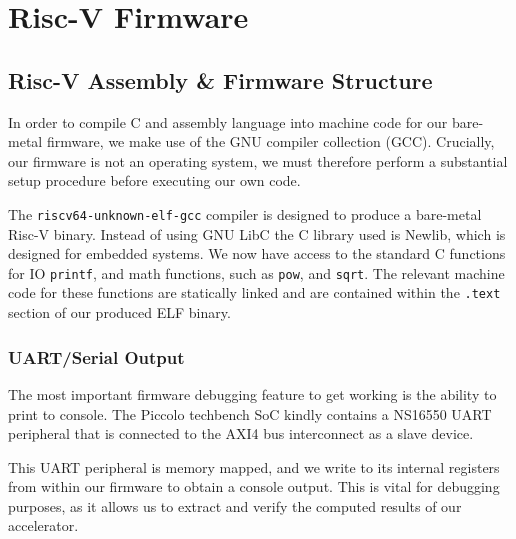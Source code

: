 \documentclass[a4paper,8pt]{report}
\begin{document}

\section{Risc-V Firmware}
\subsection{Risc-V Assembly \& Firmware Structure}
In order to compile C and assembly language into machine code for our bare-metal
firmware, we make use of the GNU compiler collection (GCC). Crucially, our
firmware is not an operating system, we must therefore perform a substantial
setup procedure before executing our own code.


The \texttt{riscv64-unknown-elf-gcc} compiler is designed to produce a
bare-metal Risc-V binary. Instead of using GNU LibC the C library used is
Newlib, which is designed for embedded systems. We now have access to the
standard C functions for IO \texttt{printf}, and math functions, such as
\texttt{pow}, and \texttt{sqrt}. The relevant machine code for these functions
are statically linked and are contained within the \texttt{.text} section of our
produced ELF binary.

\subsubsection{UART/Serial Output}
The most important firmware debugging feature to get working is the ability to
print to console. The Piccolo techbench SoC kindly contains a NS16550 UART
peripheral that is connected to the AXI4 bus interconnect as a slave device.  

This UART peripheral is memory mapped, and we write to its internal registers
from within our firmware to obtain a console output. This is vital for debugging
purposes, as it allows us to extract and verify the computed results of our
accelerator.
\end{document}
